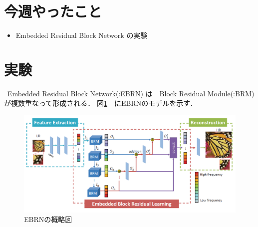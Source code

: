 \documentclass[twocolumn]{ujarticle}     %
\begin{document}

\section{今週やったこと}
\begin{itemize}
	\item Embedded Residual Block Network \cite{qiu2019embedded}の実験
\end{itemize}
\section{実験}
\ Embedded Residual Block Network(:EBRN) は　Block Residual Module(:BRM)　が複数重なって形成される．
図\ref{fig:EBRN_model}　にEBRNのモデルを示す．
\begin{figure}[ht]
	\centering
	\includegraphics[]{EBRN_model.PNG}
	\caption{EBRNの概略図\label{fig:EBRN_model}}
\end{figure}
\end{document}
